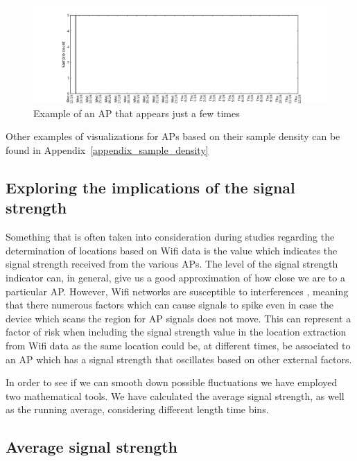 \begin{figure}[h]
\centering
\includegraphics[width =\textwidth]{figures/combinations/1553_modif.png}
\caption{Example of an AP that appears just a few times}
\label{few_samples_6_2nd_day}
\end{figure}

Other examples of visualizations for APs based on their sample density can be
found in Appendix~\ref{appendix_sample_density}%

\subsection{Exploring the implications of the signal strength}
Something that is often taken into consideration during studies regarding the
determination of locations based on Wifi data is the value which indicates
the signal strength received from the various APs. The level of the signal
strength indicator can, in general, give us a good approximation of how close we
are to a particular AP. However, Wifi networks are susceptible to interferences
\cite{MahantiCWA10}, meaning that there numerous factors which can cause signals
to spike even in case the device which scans the region for AP signals does not
move. This can represent a factor of risk when including the signal strength
value in the location extraction from Wifi data as the same location could be,
at different times, be associated to an AP which has a signal strength that
oscillates based on other external factors.

In order to see if we can smooth down possible fluctuations we have employed two
mathematical tools. We have calculated the average signal strength, as well as
the running average, considering different length time bins.

\subsection{Average signal strength}

